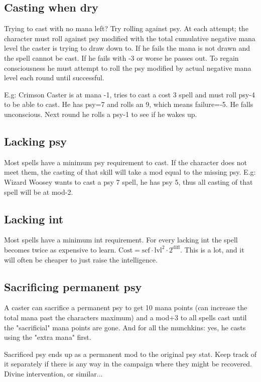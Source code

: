 \subsection*{Casting when dry}
Trying to cast with no mana left? Try rolling against psy. At each attempt; the character must roll against psy modified with the total cumulative negative mana level the caster is trying to draw down to. If he fails the mana is not drawn and the spell cannot be cast. If he fails with -3 or worse he passes out. To regain consciousness he must attempt to roll the psy modified by actual negative mana level each round until successful.

E.g: Crimson Caster is at mana -1, tries to cast a cost 3 spell and must roll psy-4 to be able to cast. He has psy=7 and rolls an 9, which means failure=-5. He falls unconscious. Next round he rolls a psy-1 to see if he wakes up.


\subsection*{Lacking psy}
Most spells have a minimum psy requirement to cast. If the character does not meet them, the casting of that skill will take a mod equal to the missing psy.
E.g: Wizard Woosey wants to cast a psy 7 spell, he has psy 5, thus all casting of that spell will be at mod-2.


\subsection*{Lacking int}
Most spells have a minimum int requirement. For every lacking int the spell becomes twice as expensive to learn. $\mathrm{Cost} = \mathrm{scf} \cdot \mathrm{lvl}^2 \cdot 2^{\mathrm{diff}}$. This is a lot, and it will often be cheaper to just raise the intelligence.


\subsection*{Sacrificing permanent psy}
A caster can sacrifice a permanent psy to get 10 mana points (can increase the total mana past the characters maximum) and a mod+3 to all spells cast until the "sacrificial" mana points are gone. And for all the munchkins: yes, he casts using the "extra mana" first.

Sacrificed psy ends up as a permanent mod to the original psy stat. Keep track of it separately if there is any way in the campaign where they might be recovered. Divine intervention, or similar...

